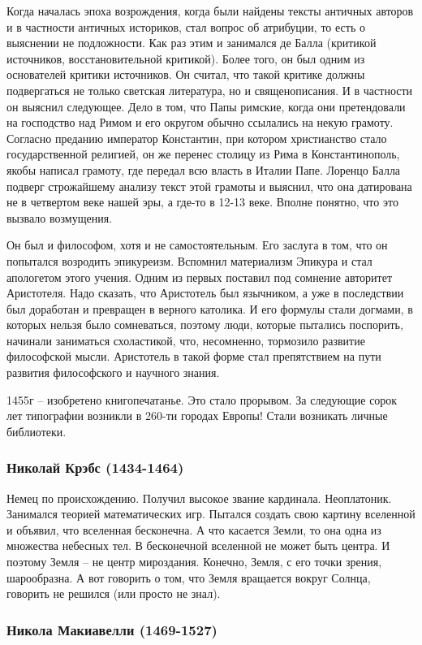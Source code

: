 Когда началась эпоха возрождения, когда были найдены тексты античных авторов и в частности античных историков, стал вопрос об атрибуции, то есть о выяснении не подложности. Как раз этим и занимался де Балла (критикой источников, восстановительной критикой). Более того, он был одним из основателей критики источников. Он считал, что такой критике должны подвергаться не только светская литература, но и священописания. И в частности он выяснил следующее. Дело в том, что Папы римские, когда они претендовали на господство над Римом и его округом обычно ссылались на некую грамоту. Согласно преданию император Константин, при котором христианство стало государственной религией, он же перенес столицу из Рима в Константинополь, якобы написал грамоту, где передал всю власть в Италии Папе. Лоренцо Балла подверг строжайшему анализу текст этой грамоты и выяснил, что она датирована не в четвертом веке нашей эры, а где-то в 12-13 веке. Вполне понятно, что это вызвало возмущения.

Он был и философом, хотя и не самостоятельным. Его заслуга в том, что он попытался возродить эпикуреизм. Вспомнил материализм Эпикура и стал апологетом этого учения. Одним из первых поставил под сомнение авторитет Аристотеля. Надо сказать, что Аристотель был язычником, а уже в последствии был доработан и превращен в верного католика. И его формулы стали догмами, в которых нельзя было сомневаться, поэтому люди, которые пытались поспорить, начинали заниматься схоластикой, что, несомненно, тормозило развитие философской мысли. Аристотель в такой форме стал препятствием на пути развития философского и научного знания.

1455г – изобретено книгопечатанье. Это стало прорывом. За следующие сорок лет типографии возникли в 260-ти городах Европы! Стали возникать личные библиотеки.
\subsubsection{Николай Крэбс (1434-1464)}

Немец по происхождению. Получил высокое звание кардинала. Неоплатоник. Занимался теорией математических игр. Пытался создать свою картину вселенной и объявил, что вселенная бесконечна. А что касается Земли, то она одна из множества небесных тел. В бесконечной вселенной не может быть центра. И поэтому Земля – не центр мироздания. Конечно, Земля, с его точки зрения, шарообразна. А вот говорить о том, что Земля вращается вокруг Солнца, говорить не решился (или просто не знал).
\subsubsection{Никола Макиавелли (1469-1527)}

